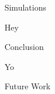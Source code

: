 \documentclass[final, 14pt]{beamer}
\newlength{\sepwid}
\newlength{\onecolwid}
\newlength{\twocolwid}
\begin{document}
\begin{frame}[t]
\begin{columns}[t]
\begin{column}{\twocolwid}
\begin{columns}[t,totalwidth=\twocolwid]
\begin{column}{\onecolwid}

\end{column} %

\end{columns} %



\end{column} %


\begin{column}{\sepwid}\end{column} %

\begin{column}{\onecolwid} %


\begin{block}{Simulations}

  Hey

\end{block}


\begin{block}{Conclusion}

Yo

\end{block}


\begin{block}{Future Work}

\end{block}




\end{column}
\end{columns}
\end{frame}
\end{document}
